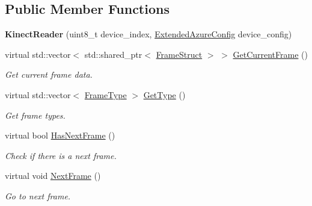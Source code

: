 \subsection*{Public Member Functions}
\begin{DoxyCompactItemize}
\item 
\mbox{\label{classmoetsi_1_1ssp_1_1KinectReader_af992a9575612d1919ce9cf70b450e2e9}} 
{\bfseries Kinect\+Reader} (uint8\+\_\+t device\+\_\+index, \hyperlink{structmoetsi_1_1ssp_1_1ExtendedAzureConfig}{Extended\+Azure\+Config} device\+\_\+config)
\item 
\mbox{\label{classmoetsi_1_1ssp_1_1KinectReader_a7f0d8f5d643ebeff0589eeb8af5b9a9e}} 
virtual std\+::vector$<$ std\+::shared\+\_\+ptr$<$ \hyperlink{structmoetsi_1_1ssp_1_1FrameStruct}{Frame\+Struct} $>$ $>$ \hyperlink{classmoetsi_1_1ssp_1_1KinectReader_a7f0d8f5d643ebeff0589eeb8af5b9a9e}{Get\+Current\+Frame} ()
\begin{DoxyCompactList}\small\item\em Get current frame data. \end{DoxyCompactList}\item 
virtual std\+::vector$<$ \hyperlink{namespacemoetsi_1_1ssp_a46efdfa2cd5a28ead465dcc8006b5a87}{Frame\+Type} $>$ \hyperlink{classmoetsi_1_1ssp_1_1KinectReader_aef896aa686cbe1ea82dfc6aad46b6ff7}{Get\+Type} ()
\begin{DoxyCompactList}\small\item\em Get frame types. \end{DoxyCompactList}\item 
virtual bool \hyperlink{classmoetsi_1_1ssp_1_1KinectReader_a08934b6eff437142e482bb21780ca171}{Has\+Next\+Frame} ()
\begin{DoxyCompactList}\small\item\em Check if there is a next frame. \end{DoxyCompactList}\item 
\mbox{\label{classmoetsi_1_1ssp_1_1KinectReader_a8495eb28b3893281c1d4bbd5ba9f9739}} 
virtual void \hyperlink{classmoetsi_1_1ssp_1_1KinectReader_a8495eb28b3893281c1d4bbd5ba9f9739}{Next\+Frame} ()
\begin{DoxyCompactList}\small\item\em Go to next frame. \end{DoxyCompactList}\item 

\end{DoxyCompactItemize}
